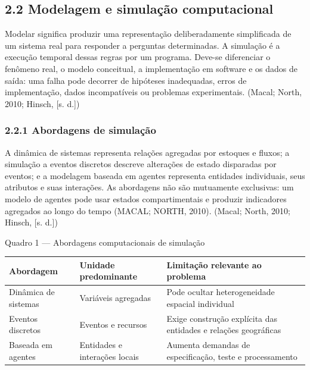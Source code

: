 \subsection{2.2 Modelagem e simulação
computacional}\label{modelagem-e-simulauxe7uxe3o-computacional}

Modelar significa produzir uma representação deliberadamente
simplificada de um sistema real para responder a perguntas determinadas.
A simulação é a execução temporal dessas regras por um programa. Deve-se
diferenciar o fenômeno real, o modelo conceitual, a implementação em
software e os dados de saída: uma falha pode decorrer de hipóteses
inadequadas, erros de implementação, dados incompatíveis ou problemas
experimentais. (Macal; North, 2010; Hinsch, {[}s. d.{]})

\subsubsection{2.2.1 Abordagens de
simulação}\label{abordagens-de-simulauxe7uxe3o}

A dinâmica de sistemas representa relações agregadas por estoques e
fluxos; a simulação a eventos discretos descreve alterações de estado
disparadas por eventos; e a modelagem baseada em agentes representa
entidades individuais, seus atributos e suas interações. As abordagens
não são mutuamente exclusivas: um modelo de agentes pode usar estados
compartimentais e produzir indicadores agregados ao longo do tempo
(MACAL; NORTH, 2010). (Macal; North, 2010; Hinsch, {[}s. d.{]})

Quadro 1 --- Abordagens computacionais de simulação

\begin{longtable}[]{@{}
  >{\raggedright\arraybackslash}p{}
  >{\raggedright\arraybackslash}p{}
  >{\raggedright\arraybackslash}p{}@{}}
\toprule\noalign{}
\begin{minipage}[b]{\linewidth}\raggedright
\textbf{Abordagem}
\end{minipage} & \begin{minipage}[b]{\linewidth}\raggedright
\textbf{Unidade predominante}
\end{minipage} & \begin{minipage}[b]{\linewidth}\raggedright
\textbf{Limitação relevante ao problema}
\end{minipage} \\
\midrule\noalign{}
\endhead
\bottomrule\noalign{}
\endlastfoot
Dinâmica de sistemas & Variáveis agregadas & Pode ocultar
heterogeneidade espacial individual \\
Eventos discretos & Eventos e recursos & Exige construção explícita das
entidades e relações geográficas \\
Baseada em agentes & Entidades e interações locais & Aumenta demandas de
especificação, teste e processamento \\
\end{longtable}

